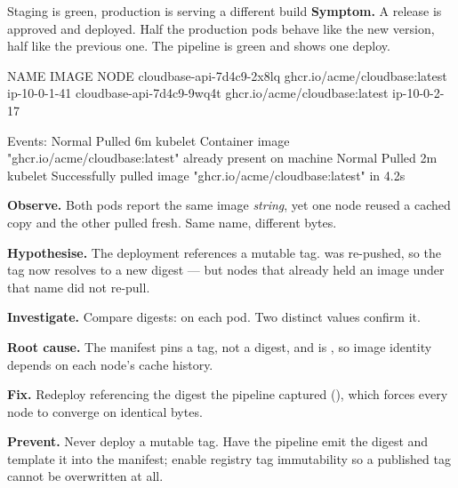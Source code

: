 \begin{debuglab}{Staging is green, production is serving a different build}
\textbf{Symptom.} A release is approved and deployed. Half the production pods behave like the new version, half like the previous one. The pipeline is green and shows one deploy.

\begin{outbox}
NAME                          IMAGE                          NODE
cloudbase-api-7d4c9-2x8lq     ghcr.io/acme/cloudbase:latest  ip-10-0-1-41
cloudbase-api-7d4c9-9wq4t     ghcr.io/acme/cloudbase:latest  ip-10-0-2-17

Events:
  Normal  Pulled  6m   kubelet  Container image "ghcr.io/acme/cloudbase:latest"
                                already present on machine
  Normal  Pulled  2m   kubelet  Successfully pulled image
                                "ghcr.io/acme/cloudbase:latest" in 4.2s
\end{outbox}

\begin{tickcheck}
  \item \textbf{Observe.} Both pods report the same image \emph{string}, yet one node reused a cached copy and the other pulled fresh. Same name, different bytes.
  \item \textbf{Hypothesise.} The deployment references a mutable tag.  was re-pushed, so the tag now resolves to a new digest --- but nodes that already held an image under that name did not re-pull.
  \item \textbf{Investigate.} Compare digests:  on each pod. Two distinct  values confirm it.
  \item \textbf{Root cause.} The manifest pins a tag, not a digest, and  is , so image identity depends on each node's cache history.
  \item \textbf{Fix.} Redeploy referencing the digest the pipeline captured (), which forces every node to converge on identical bytes.
  \item \textbf{Prevent.} Never deploy a mutable tag. Have the pipeline emit the digest and template it into the manifest; enable registry tag immutability so a published tag cannot be overwritten at all.
\end{tickcheck}
\end{debuglab}

